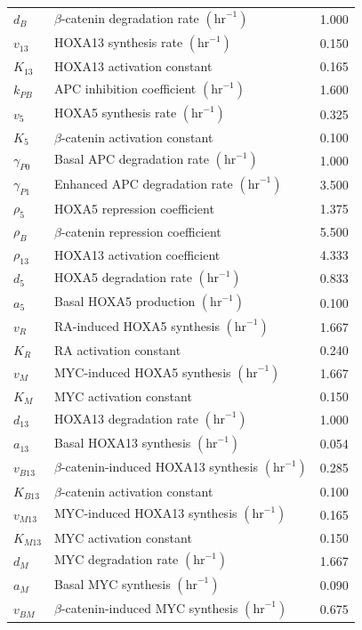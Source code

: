 \documentclass[11pt]{article}
\begin{document}
\begin{longtable}{lll}
$d_B$ & $\beta$-catenin degradation rate $(\mathrm{hr}^{-1})$ & 1.000\\
$v_{13}$ & HOXA13 synthesis rate $(\mathrm{hr}^{-1})$ & 0.150\\
$K_{13}$ & HOXA13 activation constant & 0.165\\
$k_{PB}$ & APC inhibition coefficient $(\mathrm{hr}^{-1})$ & 1.600\\
$v_5$ & HOXA5 synthesis rate $(\mathrm{hr}^{-1})$ & 0.325\\
$K_5$ & $\beta$-catenin activation constant & 0.100\\
$\gamma_{P0}$ & Basal APC degradation rate $(\mathrm{hr}^{-1})$ & 1.000\\
$\gamma_{P1}$ & Enhanced APC degradation rate $(\mathrm{hr}^{-1})$ & 3.500\\
$\rho_5$ & HOXA5 repression coefficient & 1.375\\
$\rho_B$ & $\beta$-catenin repression coefficient & 5.500\\
$\rho_{13}$ & HOXA13 activation coefficient & 4.333\\
$d_5$ & HOXA5 degradation rate $(\mathrm{hr}^{-1})$ & 0.833\\
$a_5$ & Basal HOXA5 production $(\mathrm{hr}^{-1})$ & 0.100\\
$v_R$ & RA-induced HOXA5 synthesis $(\mathrm{hr}^{-1})$ & 1.667\\
$K_R$ & RA activation constant & 0.240\\
$v_M$ & MYC-induced HOXA5 synthesis $(\mathrm{hr}^{-1})$ & 1.667\\
$K_M$ & MYC activation constant & 0.150\\
$d_{13}$ & HOXA13 degradation rate $(\mathrm{hr}^{-1})$ & 1.000\\
$a_{13}$ & Basal HOXA13 synthesis $(\mathrm{hr}^{-1})$ & 0.054\\
$v_{B13}$ & $\beta$-catenin-induced HOXA13 synthesis $(\mathrm{hr}^{-1})$ & 0.285\\
$K_{B13}$ & $\beta$-catenin activation constant & 0.100\\
$v_{M13}$ & MYC-induced HOXA13 synthesis $(\mathrm{hr}^{-1})$ & 0.165\\
$K_{M13}$ & MYC activation constant & 0.150\\
$d_M$ & MYC degradation rate $(\mathrm{hr}^{-1})$ & 1.667\\
$a_M$ & Basal MYC synthesis $(\mathrm{hr}^{-1})$ & 0.090\\
$v_{BM}$ & $\beta$-catenin-induced MYC synthesis $(\mathrm{hr}^{-1})$ & 0.675\\

\end{longtable}
\end{document}
